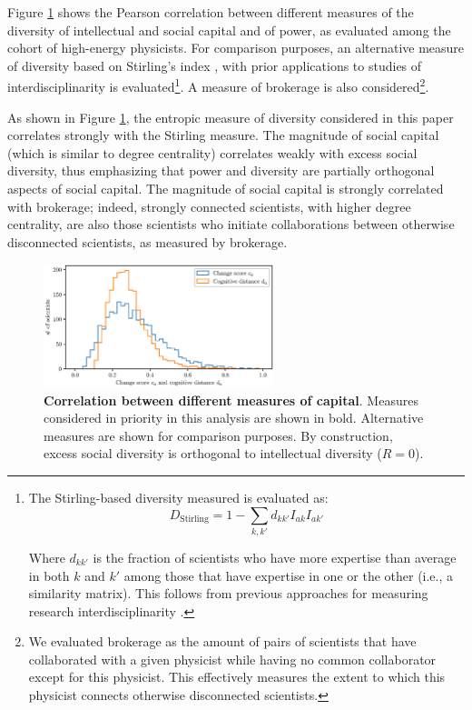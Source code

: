 \documentclass{article}
\begin{document}
Figure \ref{fig:capital_measures} shows the Pearson correlation between different measures of the diversity of intellectual and social capital and of power, as evaluated among the cohort of high-energy physicists. For comparison purposes, an alternative measure of diversity based on Stirling's index \citep{Stirling2007}, with prior applications to studies of interdisciplinarity \citep{Porter2007,Leahey2016} is evaluated\footnote{The Stirling-based diversity measured is evaluated as: \begin{equation}
    D_{\text{Stirling}} = 1-\sum_{k,k'}d_{kk'}I_{ak}I_{ak'}
\end{equation}

Where $d_{kk'}$ is the fraction of scientists who have more expertise than average in both $k$ and $k'$ among those that have expertise in one or the other (i.e., a similarity matrix). This  follows from previous approaches for measuring research interdisciplinarity \citealt{Porter2007,Leahey2016}.}. A measure of brokerage is also considered\footnote{We evaluated brokerage as the amount of pairs of scientists that have collaborated with a given physicist while having no common collaborator except for this physicist. This effectively measures the extent to which this physicist connects otherwise disconnected scientists.}. 

As shown in Figure \ref{fig:capital_measures}, the entropic measure of diversity considered in this paper correlates strongly with the Stirling measure. The magnitude of social capital (which is similar to degree centrality) correlates weakly with excess social diversity, thus emphasizing that power and diversity are partially orthogonal aspects of social capital. The magnitude of social capital is strongly correlated with brokerage; indeed, strongly connected scientists, with higher degree centrality, are also those scientists who initiate collaborations between otherwise disconnected scientists, as measured by brokerage.


\begin{figure}[h]
    \centering
    \includegraphics[width=0.6\textwidth]{Fig15}
    \caption{\textbf{Correlation between different measures of capital}. Measures considered in priority in this analysis are shown in bold. Alternative measures are shown for comparison purposes. By construction, excess social diversity is orthogonal to intellectual diversity ($R=0$). }
    \label{fig:capital_measures}
\end{figure}
\end{document}
